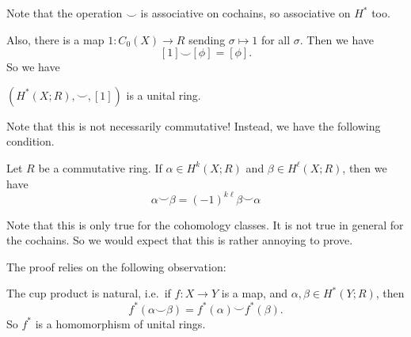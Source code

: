 \documentclass[a4paper]{article}
\theoremstyle{definition}
\begin{document}
Note that the operation $\smile$ is associative on cochains, so associative on $H^*$ too.

Also, there is a map $1: C_0(X) \to R$ sending $\sigma \mapsto 1$ for all $\sigma$. Then we have
\[
  [1] \smile [\phi] = [\phi].
\]
So we have
\begin{prop}
  $(H^*(X; R), \smile, [1])$ is a unital ring.
\end{prop}

Note that this is not necessarily commutative! Instead, we have the following  condition.
\begin{prop}
  Let $R$ be a commutative ring. If $\alpha \in H^k(X; R)$ and $\beta \in H^\ell(X; R)$, then we have
  \[
    \alpha \smile \beta = (-1)^{k\ell}\beta \smile \alpha
  \]
\end{prop}

Note that this is only true for the cohomology classes. It is not true in general for the cochains. So we would expect that this is rather annoying to prove.

The proof relies on the following observation:

\begin{prop}
  The cup product is natural, i.e.\ if $f: X \to Y$ is a map, and $\alpha, \beta \in H^*(Y; R)$, then
  \[
    f^*(\alpha \smile \beta) = f^*(\alpha) \smile f^*(\beta).
  \]
  So $f^*$ is a homomorphism of unital rings.
\end{prop}
\end{document}
